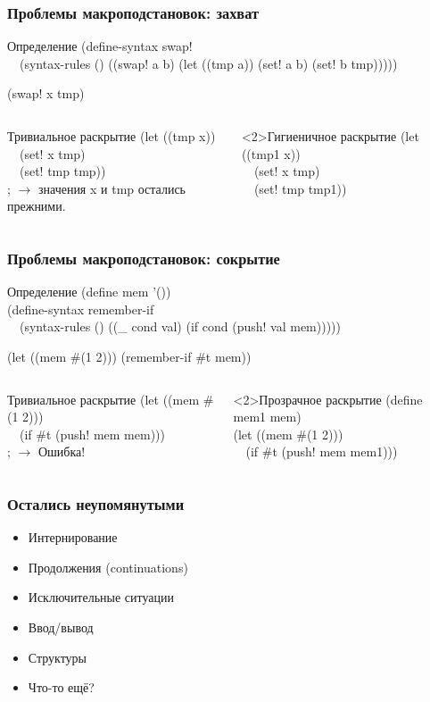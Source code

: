 \documentclass[16pt,pdf,unicode]{beamer}
\begin{document}
\begin{frame}
\frametitle{Проблемы макроподстановок: захват}
\begin{block}{Определение}
(define-syntax swap!\\
\ \ (syntax-rules () ((swap! a b) (let ((tmp a)) (set! a b) (set! b tmp)))))
\end{block}
\begin{block}{}
  (swap! x tmp)
\end{block}
\centering{\huge{$\Downarrow$}}
\begin{columns}
\begin{alertblock}{Тривиальное раскрытие}
  (let ((tmp x))\\
  \ \ (set! x tmp)\\
  \ \ (set! tmp tmp))\\
  ; $\rightarrow$ значения x и tmp остались прежними.
\end{alertblock}
\begin{exampleblock}<2>{Гигиеничное раскрытие}
  (let ((tmp1 x))\\
  \ \ (set! x tmp)\\
  \ \ (set! tmp tmp1))
\end{exampleblock}
\end{columns}
\end{frame}

\begin{frame}
\frametitle{Проблемы макроподстановок: сокрытие}
\begin{block}{Определение}
  (define mem '())\\
  (define-syntax remember-if\\
  \ \ (syntax-rules () ((\_ cond val) (if cond (push! val mem)))))
\end{block}
\begin{block}{}
  (let ((mem \#(1 2))) (remember-if \#t mem))
\end{block}
\centering{\huge{$\Downarrow$}}
\begin{columns}
\begin{alertblock}{Тривиальное раскрытие}
  (let ((mem \#(1 2)))\\
  \ \ (if \#t (push! mem mem)))\\
  ; $\rightarrow$ Ошибка!
\end{alertblock}
\begin{exampleblock}<2>{Прозрачное раскрытие}
  (define mem1 mem)\\
  (let ((mem \#(1 2)))\\
  \ \ (if \#t (push! mem mem1)))
\end{exampleblock}
\end{columns}
\end{frame}

\begin{frame}
\frametitle{Остались неупомянутыми}
\begin{itemize}
\item Интернирование
\item Продолжения (continuations)
\item Исключительные ситуации
\item Ввод/вывод
\item Структуры
\item Что-то ещё?
\end{itemize}
\end{frame}
\end{document}
